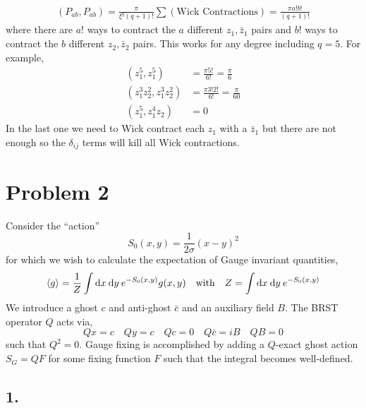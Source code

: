 \documentclass[12pt]{article}
\begin{document}
\begin{align*}
(P_{ab}, P_{ab}) = \frac{\pi}{\xi^q (q + 1)!} \sum (\text{Wick Contractions}) = \frac{\pi a! b!}{(q + 1)!} 
\end{align*}
where there are $a!$ ways to contract the $a$ different $z_1, \bar{z}_1$ pairs and $b!$ ways to contract the $b$ different $z_2, \bar{z}_2$ pairs. This works for any degree including $q = 5$. For example,
\begin{align*}
(z_1^5, z_1^5) & = \frac{\pi 5!}{6!} = \frac{\pi}{6}
\\
(z_1^3 z_2^2, z_1^3 z_2^2) & = \frac{\pi 3! 2!}{6!} = \frac{\pi}{60}
\\
(z_1^5, z_1^4 z_2) & = 0
\end{align*}
In the last one we need to Wick contract each $z_1$ with a $\bar{z}_1$ but there are not enough so the $\delta_{ij}$ terms will kill all Wick contractions.  

\section*{Problem 2}
Consider the ``action''
\[ S_0(x,y) = \frac{1}{2 \sigma} (x - y)^2 \]
for which we wish to calculate the expectation of Gauge invariant quantities,
\[ \left< g \right> = \frac{1}{Z} \int \mathrm{d}x \: \mathrm{d}y \: e^{-S_0(x,y)} g(x,y) \quad \text{with} \quad Z = \int \mathrm{d}x \: \mathrm{d}y \: e^{-S_0(x,y)} \]
We introduce a ghost $c$ and anti-ghost $\bar{c}$ and an auxiliary field $B$. The BRST operator $Q$ acts via,
\[ Q x = c \quad Q y = c \quad Q c = 0 \quad Q \bar{c} = i B \quad Q B = 0 \]
such that $Q^2 = 0$. Gauge fixing is accomplished by adding a $Q$-exact ghost action $S_G = QF$ for some fixing function $F$ such that the integral becomes well-defined. 


\subsection*{1.}
\end{document}
